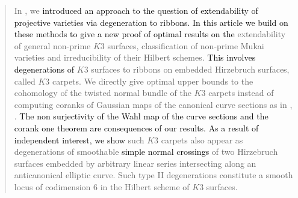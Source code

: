 \documentclass[11pt,twoside]{amsart}
\theoremstyle{plain}
\numberwithin{equation}{section}
\theoremstyle{definition}
\begin{document}
\maketitle
\begin{abstract}

In \cite{BM24}, we \textcolor{black}{introduced an approach to the question of extendability of projective varieties via degeneration to ribbons. In this article we build on \textcolor{black}{these} methods to \textcolor{black}{give a new proof of} optimal results on the} extendability of general non-prime $K3$ surfaces, classification of non-prime Mukai varieties and irreducibility of their Hilbert schemes. \textcolor{black}{This involves degenerations of} $K3$ surfaces to ribbons on embedded Hirzebruch surfaces, called $K3$ carpets. We directly give optimal upper bounds to the cohomology of the twisted normal bundle of the $K3$ carpets instead of computing coranks of Gaussian maps of the canonical curve sections as in \cite{CLM94}, \cite{CLM98}. \textcolor{black}{The non surjectivity of the Wahl map of the curve sections and the corank one theorem are consequences of our results.} %
\textcolor{black}{As a result of independent interest, we show} such $K3$ carpets also appear as degenerations of smoothable \textcolor{black}{simple normal crossings} of two Hirzebruch surfaces embedded by arbitrary linear series intersecting along an anticanonical elliptic curve. 
Such type II degenerations constitute a smooth locus of codimension $6$ in the Hilbert scheme of $K3$ surfaces. 

\end{abstract}
\end{document}
